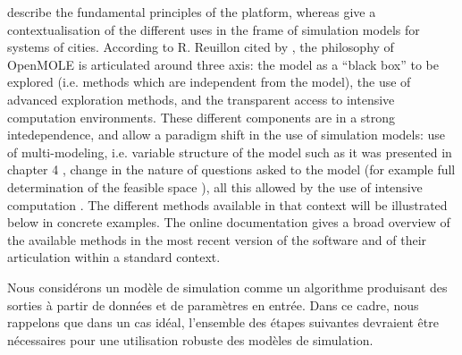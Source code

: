 \documentclass[10pt]{article}
\begin{document}
\cite{} describe the fundamental principles of the platform, whereas \cite{} give a contextualisation of the different uses in the frame of simulation models for systems of cities. According to R. Reuillon cited by \cite{}, the philosophy of OpenMOLE is articulated around three axis: the model as a ``black box'' to be explored (i.e. methods which are independent from the model), the use of advanced exploration methods, and the transparent access to intensive computation environments. These different components are in a strong intedependence, and allow a paradigm shift in the use of simulation models: use of multi-modeling, i.e. variable structure of the model such as it was presented in chapter 4 \citep{}, change in the nature of questions asked to the model (for example full determination of the feasible space \citep{}), all this allowed by the use of intensive computation \citep{}. The different methods available in that context will be illustrated below in concrete examples. The online documentation gives a broad overview of the available methods in the most recent version of the software and of their articulation within a standard context.


Nous considérons un modèle de simulation comme un algorithme produisant des sorties à partir de données et de paramètres en entrée. Dans ce cadre, nous rappelons que dans un cas idéal, l’ensemble des étapes suivantes devraient être nécessaires pour une utilisation robuste des modèles de simulation.
\end{document}
